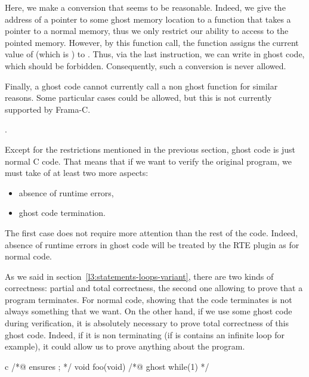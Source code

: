 

Here, we make a conversion that seems to be reasonable. Indeed, we give
the address of a pointer to some ghost memory location to a function
that takes a pointer to a normal memory, thus we only restrict our ability
to access to the pointed memory. However, by this function call, the function
 assigns the current value of  (which is
) to . Thus, via the last instruction, we
can write  in ghost code, which should be forbidden.
Consequently, such a conversion is never allowed.


Finally, a ghost code cannot currently call a non ghost function for
similar reasons. Some particular cases could be allowed, but this is
not currently supported by Frama-C.


\label{l3:acsl-logic-definitions-what-remains}.


Except for the restrictions mentioned in the previous section,
ghost code is just normal C code. That means that if we want to
verify the original program, we must take of at least two more
aspects:


\begin{itemize}
\item absence of runtime errors,
\item ghost code termination.
\end{itemize}


The first case does not require more attention than the rest of the
code. Indeed, absence of runtime errors in ghost code will be treated
by the RTE plugin as for normal code.


As we said in section~\ref{l3:statements-loops-variant}, there are two
kinds of correctness: partial and total correctness, the second one allowing
to prove that a program terminates. For normal code, showing that the code
terminates is not always something that we want. On the other hand, if we
use some ghost code during verification, it is absolutely necessary to prove
total correctness of this ghost code. Indeed, if it is non terminating (if
is contains an infinite loop for example), it could allow us to prove
anything about the program.


\begin{CodeBlock}{c}
/*@ ensures \false ; */
void foo(void){
  /*@ ghost
    while(1){}
  */
}
\end{CodeBlock}



